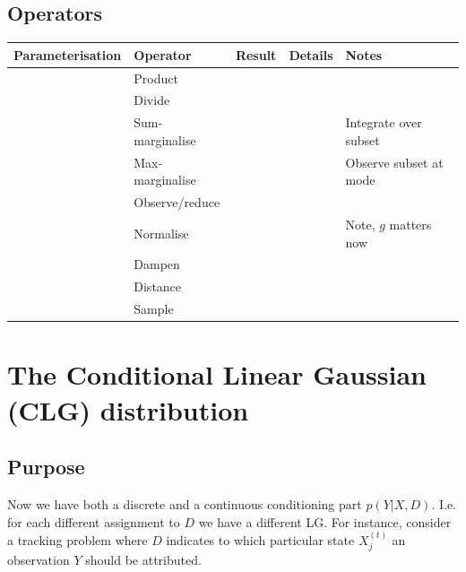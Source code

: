 \documentclass[oneside,english]{scrbook}
\begin{document}
\section{Operators}
\begin{tabular}{lllll}
  Parameterisation         & Operator             & Result                   & Details & Notes\\ \hline
                           & Product              &                          &         & \parbox{0.3\textwidth}{}\\
                           & Divide               &                          &         & \parbox{0.3\textwidth}{}\\
                           & Sum-marginalise      &                          &         & \parbox{0.3\textwidth}{Integrate over subset}\\
                           & Max-marginalise      &                          &         & \parbox{0.3\textwidth}{Observe subset at mode}\\
                           & Observe/reduce       &                          &         & \parbox{0.3\textwidth}{}\\
                           & Normalise            &                          &         & \parbox{0.3\textwidth}{Note, $g$ matters now}\\
                           & Dampen               &                          &         & \parbox{0.3\textwidth}{}\\
                           & Distance             &                          &         & \parbox{0.3\textwidth}{}\\
                           & Sample               &                          &         & \parbox{0.3\textwidth}{}\\
\end{tabular}

\chapter{The Conditional Linear Gaussian (CLG) distribution}

\section{Purpose}
Now we have both a discrete and a continuous conditioning part
$p(Y|X,D)$. I.e. for each different assignment to $D$ we have a
different LG.  For instance, consider a tracking problem where $D$
indicates to which particular state $X_j^{(t)}$ an observation $Y$
should be attributed.
\end{document}
